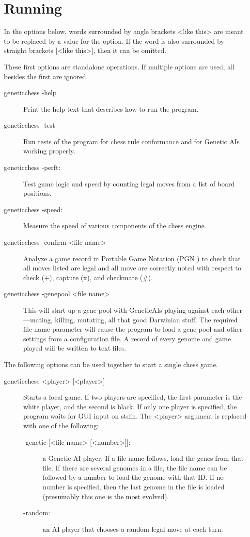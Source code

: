 \documentclass[letterpaper]{article}
\newcommand{\code}[1]{\small\textsf{#1}}
\renewcommand{\_}{\allowbreak\textunderscore\allowbreak}
\begin{document}
\section{Running}\label{running}

In the options below, words surrounded by angle brackets \code{<like this>} are meant to be replaced by a value for the option. If the word is also surrounded by straight brackets \code{[<like this>]}, then it can be omitted.

These first options are standalone operations. If multiple options are used, all besides the first are ignored.
\begin{description}
	\item[\code{genetic\_chess -help}] Print the help text that describes how to run the program.
	\item[\code{genetic\_chess -test}] Run tests of the program for chess rule conformance and for Genetic AIs working properly.
	\item[\code{genetic\_chess -perft}:] Test game logic and speed by counting legal moves from a list of board positions.
	\item[\code{genetic\_chess -speed}:] Measure the speed of various components of the chess engine.
	\item[\code{genetic\_chess -confirm <file name>}] Analyze a game record in Portable Game Notation (PGN \cite{pgn-file-format}) to check that all moves listed are legal and all move are correctly noted with respect to check (+), capture (x), and checkmate (\#).
	\item[\code{genetic\_chess -genepool <file name>}]
This will start up a gene pool with Genetic\_AIs playing against each other---mating, killing, mutating, all that good Darwinian stuff. The required file name parameter will cause the program to load a gene pool and other settings from a configuration file. A record of every genome and game played will be written to text files.
\end{description}
The following options can be used together to start a single chess game.
\begin{description}
	\item[\code{genetic\_chess <player> [<player>]}] Starts a local game. If two players are specified, the first parameter is the white player, and the second is black. If only one player is specified, the program waits for GUI input on stdin. The \code{<player>} argument is replaced with one of the following:
	\begin{description}
		\item[\code{-genetic [<file name> [<number>]]}:] a Genetic AI player. If a file name follows, load the genes from that file. If there are several genomes in a file, the file name can be followed by a number to load the genome with that ID\@. If no number is specified, then the last genome in the file is loaded (presumably this one is the most evolved).
		\item[\code{-random}:] an AI player that chooses a random legal move at each turn.
	\end{description}
\end{description}
\end{document}
